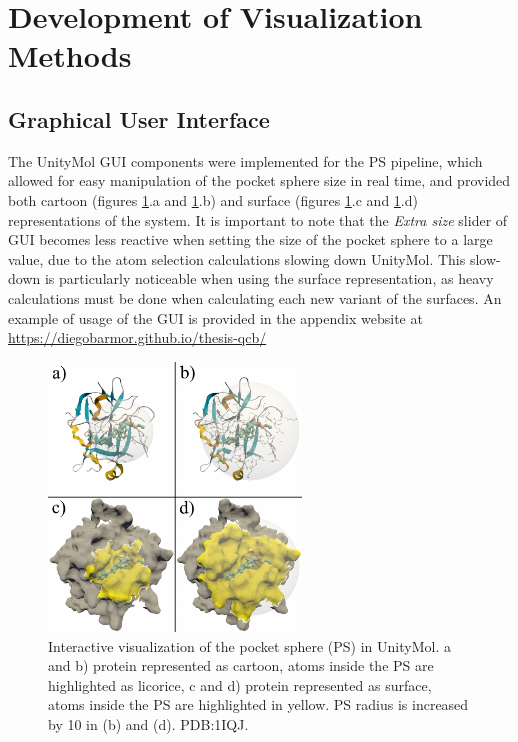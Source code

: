 \section{Development of Visualization Methods}
  \subsection{Graphical User Interface}
    The UnityMol GUI components were implemented for the PS pipeline, which allowed for easy manipulation of the pocket sphere size in real time, and provided both cartoon (figures \ref{fig:results/gui_sphere}.a and \ref{fig:results/gui_sphere}.b) and surface (figures \ref{fig:results/gui_sphere}.c and \ref{fig:results/gui_sphere}.d) representations of the system. It is important to note that the \textit{Extra size} slider of GUI becomes less reactive when setting the size of the pocket sphere to a large value, due to the atom selection calculations slowing down UnityMol. This slow-down is particularly noticeable when using the surface representation, as heavy calculations must be done when calculating each new variant of the surfaces. An example of usage of the GUI is provided in the appendix website at \url{https://diegobarmor.github.io/thesis-qcb/}

    \begin{figure}[H]
      \centering
      \includegraphics[width=0.6\textwidth]{figures/results/gui_sphere.png}
      \caption{\label{fig:results/gui_sphere} Interactive visualization of the pocket sphere (PS) in UnityMol. a and b) protein represented as cartoon, atoms inside the PS are highlighted as licorice, c and d) protein represented as surface, atoms inside the PS are highlighted in yellow. PS radius is increased by 10 in (b) and (d). PDB:1IQJ.}
    \end{figure}

